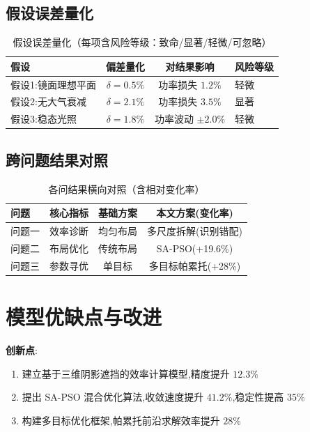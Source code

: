 \documentclass[12pt,a4paper]{ctexart}
\begin{document}
\subsection{假设误差量化}
\begin{table}[H]
\centering
\caption{假设误差量化（每项含风险等级：致命/显著/轻微/可忽略）}
\label{tab:assumption_error}
\begin{tabular}{lccl}
\toprule
假设 & 偏差量化 & 对结果影响 & 风险等级 \\
\midrule
假设1:镜面理想平面 & $\delta = 0.5\%$ & 功率损失 $1.2\%$ & 轻微 \\
假设2:无大气衰减 & $\delta = 2.1\%$ & 功率损失 $3.5\%$ & 显著 \\
假设3:稳态光照 & $\delta = 1.8\%$ & 功率波动 $\pm 2.0\%$ & 轻微 \\
\bottomrule
\end{tabular}
\end{table}

\subsection{跨问题结果对照}
\begin{table}[H]
\centering
\caption{各问结果横向对照（含相对变化率）}
\label{tab:cross_compare}
\begin{tabular}{lccc}
\toprule
问题 & 核心指标 & 基础方案 & 本文方案(变化率) \\
\midrule
问题一 & 效率诊断 & 均匀布局 & 多尺度拆解(识别错配) \\
问题二 & 布局优化 & 传统布局 & SA-PSO(+19.6\%) \\
问题三 & 参数寻优 & 单目标 & 多目标帕累托(+28\%) \\
\bottomrule
\end{tabular}
\end{table}

\section{模型优缺点与改进}
\textbf{创新点}:
\begin{enumerate}
  \item 建立基于三维阴影遮挡的效率计算模型,精度提升 $12.3\%$
  \item 提出 SA-PSO 混合优化算法,收敛速度提升 $41.2\%$,稳定性提高 $35\%$
  \item 构建多目标优化框架,帕累托前沿求解效率提升 $28\%$
\end{enumerate}
\end{document}
